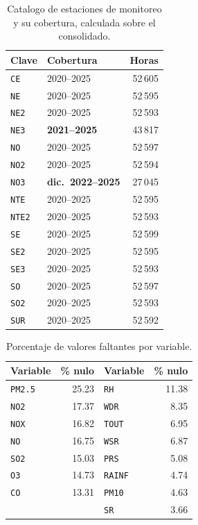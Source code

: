 \begin{table}[t]
  \centering
  \caption{Catalogo de estaciones de monitoreo y su cobertura, calculada
    sobre el consolidado.}
  \label{tab:dic-estaciones}
  \small
  \begin{tabular}{llr}
    \toprule
    Clave & Cobertura & Horas \\
    \midrule
    \texttt{CE}   & 2020--2025                & 52\,605 \\
    \texttt{NE}   & 2020--2025                & 52\,595 \\
    \texttt{NE2}  & 2020--2025                & 52\,593 \\
    \texttt{NE3}  & \textbf{2021--2025}       & 43\,817 \\
    \texttt{NO}   & 2020--2025                & 52\,597 \\
    \texttt{NO2}  & 2020--2025                & 52\,594 \\
    \texttt{NO3}  & \textbf{dic.\ 2022--2025} & 27\,045 \\
    \texttt{NTE}  & 2020--2025                & 52\,595 \\
    \texttt{NTE2} & 2020--2025                & 52\,593 \\
    \texttt{SE}   & 2020--2025                & 52\,599 \\
    \texttt{SE2}  & 2020--2025                & 52\,595 \\
    \texttt{SE3}  & 2020--2025                & 52\,593 \\
    \texttt{SO}   & 2020--2025                & 52\,597 \\
    \texttt{SO2}  & 2020--2025                & 52\,593 \\
    \texttt{SUR}  & 2020--2025                & 52\,592 \\
    \bottomrule
  \end{tabular}
\end{table}

\begin{table}[t]
  \centering
  \caption{Porcentaje de valores faltantes por variable.}
  \label{tab:dic-faltantes}
  \small
  \begin{tabular}{lr@{\qquad}lr}
    \toprule
    Variable & \% nulo & Variable & \% nulo \\
    \midrule
    \texttt{PM2.5} & 25.23 & \texttt{RH}    & 11.38 \\
    \texttt{NO2}   & 17.37 & \texttt{WDR}   & 8.35  \\
    \texttt{NOX}   & 16.82 & \texttt{TOUT}  & 6.95  \\
    \texttt{NO}    & 16.75 & \texttt{WSR}   & 6.87  \\
    \texttt{SO2}   & 15.03 & \texttt{PRS}   & 5.08  \\
    \texttt{O3}    & 14.73 & \texttt{RAINF} & 4.74  \\
    \texttt{CO}    & 13.31 & \texttt{PM10}  & 4.63  \\
                   &       & \texttt{SR}    & 3.66  \\
    \bottomrule
  \end{tabular}
\end{table}

